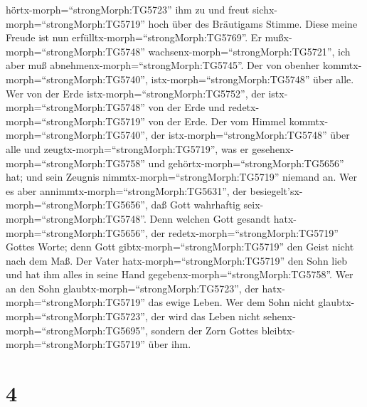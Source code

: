 hörtx-morph=``strongMorph:TG5723'' ihm zu und freut
sichx-morph=``strongMorph:TG5719'' hoch über des Bräutigams Stimme.
Diese meine Freude ist nun erfülltx-morph=``strongMorph:TG5769''.
 Er mußx-morph=``strongMorph:TG5748''
wachsenx-morph=``strongMorph:TG5721'', ich aber muß
abnehmenx-morph=``strongMorph:TG5745''.  Der von obenher
kommtx-morph=``strongMorph:TG5740'', istx-morph=``strongMorph:TG5748''
über alle. Wer von der Erde istx-morph=``strongMorph:TG5752'', der
istx-morph=``strongMorph:TG5748'' von der Erde und
redetx-morph=``strongMorph:TG5719'' von der Erde. Der vom Himmel
kommtx-morph=``strongMorph:TG5740'', der
istx-morph=``strongMorph:TG5748'' über alle  und
zeugtx-morph=``strongMorph:TG5719'', was er
gesehenx-morph=``strongMorph:TG5758'' und
gehörtx-morph=``strongMorph:TG5656'' hat; und sein Zeugnis
nimmtx-morph=``strongMorph:TG5719'' niemand an.  Wer es
aber annimmtx-morph=``strongMorph:TG5631'', der
besiegelt'sx-morph=``strongMorph:TG5656'', daß Gott wahrhaftig
seix-morph=``strongMorph:TG5748''.  Denn welchen Gott
gesandt hatx-morph=``strongMorph:TG5656'', der
redetx-morph=``strongMorph:TG5719'' Gottes Worte; denn Gott
gibtx-morph=``strongMorph:TG5719'' den Geist nicht nach dem Maß.
 Der Vater hatx-morph=``strongMorph:TG5719'' den Sohn lieb
und hat ihm alles in seine Hand gegebenx-morph=``strongMorph:TG5758''.
 Wer an den Sohn glaubtx-morph=``strongMorph:TG5723'', der
hatx-morph=``strongMorph:TG5719'' das ewige Leben. Wer dem Sohn nicht
glaubtx-morph=``strongMorph:TG5723'', der wird das Leben nicht
sehenx-morph=``strongMorph:TG5695'', sondern der Zorn Gottes
bleibtx-morph=``strongMorph:TG5719'' über ihm.

\hypertarget{section-3}{%
\section{4}\label{section-3}}

